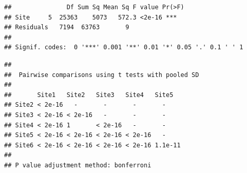 \documentclass[12 pt]{article}
\begin{document}
\begin{verbatim}
##               Df Sum Sq Mean Sq F value Pr(>F)    
## Site     5  25363    5073   572.3 <2e-16 ***
## Residuals   7194  63763       9                   
## 
## Signif. codes:  0 '***' 0.001 '**' 0.01 '*' 0.05 '.' 0.1 ' ' 1
\end{verbatim}

\begin{verbatim}
## 
##  Pairwise comparisons using t tests with pooled SD 
## 
##       Site1   Site2   Site3   Site4   Site5  
## Site2 < 2e-16   -       -       -       -      
## Site3 < 2e-16 < 2e-16   -       -       -      
## Site4 < 2e-16 1       < 2e-16   -       -      
## Site5 < 2e-16 < 2e-16 < 2e-16 < 2e-16   -      
## Site6 < 2e-16 < 2e-16 < 2e-16 < 2e-16 1.1e-11
## 
## P value adjustment method: bonferroni
\end{verbatim}
\end{document}
